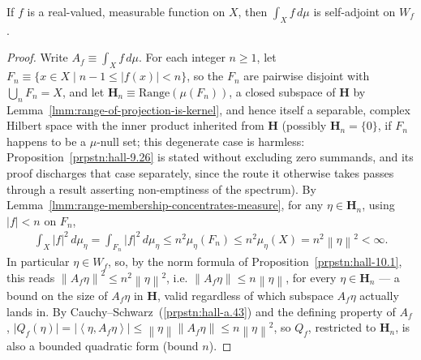 \begin{proposition}
    \label{prpstn:hall-10.3}
    \leanok
    If $f$ is a real-valued, measurable function on $X$, then $\int_X f \, d\mu$ is self-adjoint on $W_f$.
\end{proposition}
\begin{proof}
    \leanok
Write $A_f \equiv \int_X f \, d\mu$. For each integer $n \ge 1$, let $F_n \equiv \{ x \in X \mid n - 1 \le \lvert f(x) \rvert < n \}$, so the $F_n$ are pairwise disjoint with $\bigcup_n F_n = X$, and let $\mathbf{H}_n \equiv \text{Range}(\mu(F_n))$, a closed subspace of $\mathbf{H}$ by Lemma~\ref{lmm:range-of-projection-is-kernel}, and hence itself a separable, complex Hilbert space with the inner product inherited from $\mathbf{H}$ (possibly $\mathbf{H}_n = \{0\}$, if $F_n$ happens to be a $\mu$-null set; this degenerate case is harmless: Proposition~\ref{prpstn:hall-9.26} is stated without excluding zero summands, and its proof discharges that case separately, since the route it otherwise takes passes through a result asserting non-emptiness of the spectrum). By Lemma~\ref{lmm:range-membership-concentrates-measure}, for any $\eta \in \mathbf{H}_n$, using $\lvert f \rvert < n$ on $F_n$,
\begin{align}
    \int_X \lvert f \rvert^2 \, d\mu_\eta = \int_{F_n} \lvert f \rvert^2 \, d\mu_\eta \le n^2 \mu_\eta(F_n) \le n^2 \mu_\eta(X) = n^2 \left\| \eta \right\|^2 < \infty.
\end{align}
In particular $\eta \in W_f$, so, by the norm formula of Proposition~\ref{prpstn:hall-10.1}, this reads $\left\| A_f \eta \right\|^2 \le n^2 \left\| \eta \right\|^2$, i.e. $\left\| A_f \eta \right\| \le n \left\| \eta \right\|$, for every $\eta \in \mathbf{H}_n$ — a bound on the size of $A_f \eta$ in $\mathbf{H}$, valid regardless of which subspace $A_f \eta$ actually lands in. By Cauchy–Schwarz~(\ref{prpstn:hall-a.43}) and the defining property of $A_f$, $\lvert Q_f(\eta) \rvert = \lvert \left< \eta, A_f\eta \right> \rvert \le \left\| \eta \right\| \left\| A_f \eta \right\| \le n \left\| \eta \right\|^2$, so $Q_f$, restricted to $\mathbf{H}_n$, is also a bounded quadratic form (bound $n$).


\end{proof}
